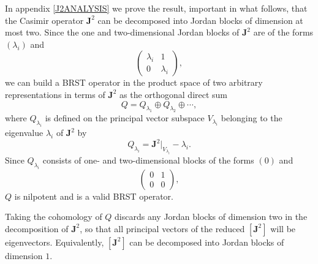 \documentclass[a4paper,dvips,12pt]{article}
\begin{document}
    In appendix \ref{J2ANALYSIS} we prove the result, important in
    what follows, that the Casimir operator $\mathbf{J}^2$ can be
    decomposed into Jordan blocks of dimension at most two.  Since
    the one and two-dimensional Jordan blocks of $\mathbf{J}^2$ are of the
    forms $\left(\lambda_i\right)$ and
    \begin{equation}
        \left(
            \begin{array}{cc}
                \lambda_i & 1 \\
                0 & \lambda_i
            \end{array}
        \right), \label{J2BLOCK}
    \end{equation}
    we can build a BRST operator in the
    product space of two arbitrary representations in terms of
    $\mathbf{J}^2$ as the orthogonal direct sum
    \begin{equation}
        Q = Q_{\lambda_1} \oplus Q_{\lambda_2} \oplus \cdots,
        \label{Q}
    \end{equation}
    where $Q_{\lambda_i}$ is defined on the principal vector subspace
    $V_{\lambda_i}$ belonging to the eigenvalue $\lambda_i$ of $\mathbf{J}^2$ by
    \begin{equation}
            Q_{\lambda_i} = \mathbf{J}^2|_{V_{\lambda_i}} -
            \lambda_i.
        \label{QI}
    \end{equation}
    Since $Q_{\lambda_i}$ consists of one- and two-dimensional blocks of the
    forms
    $\left(0\right)$ and
    \begin{equation}
        \left(
            \begin{array}{cc}
                0 & 1 \\
                0 & 0
            \end{array}
        \right), \label{QBLOCK}
    \end{equation}
    $Q$ is nilpotent and is a valid BRST operator.

    Taking the cohomology of $Q$ discards any Jordan
    blocks of dimension two in the decomposition of
    $\mathbf{J}^2$, so that all principal vectors of
    the reduced $[\mathbf{J}^2]$ will be eigenvectors.
    Equivalently, $[\mathbf{J}^2]$ can be decomposed into Jordan
    blocks of dimension $1$.
\end{document}
